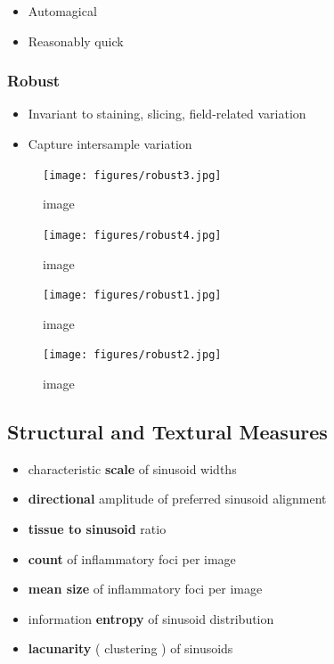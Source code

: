 \documentclass{article}
\begin{document}
    \begin{itemize}
\itemsep1pt\parskip0pt
\item
  Automagical
\item
  Reasonably quick
\end{itemize}


    \subsubsection{Robust}


    \begin{itemize}
\itemsep1pt\parskip0pt
\item
  Invariant to staining, slicing, field-related variation
\item
  Capture intersample variation
\end{itemize}

    \begin{figure}[htbp]
\centering
\texttt{[image: figures/robust3.jpg]}
\caption{image}
\end{figure}

    \begin{figure}[htbp]
\centering
\texttt{[image: figures/robust4.jpg]}
\caption{image}
\end{figure}

    \begin{figure}[htbp]
\centering
\texttt{[image: figures/robust1.jpg]}
\caption{image}
\end{figure}

    \begin{figure}[htbp]
\centering
\texttt{[image: figures/robust2.jpg]}
\caption{image}
\end{figure}


    \subsection{Structural and Textural Measures}


    \begin{itemize}
\itemsep1pt\parskip0pt
\item
  characteristic \textbf{scale} of sinusoid widths
\item
  \textbf{directional} amplitude of preferred sinusoid alignment
\item
  \textbf{tissue to sinusoid} ratio
\item
  \textbf{count} of inflammatory foci per image
\item
  \textbf{mean size} of inflammatory foci per image
\item
  information \textbf{entropy} of sinusoid distribution
\item
  \textbf{lacunarity} ( clustering ) of sinusoids
\end{itemize}
\end{document}

